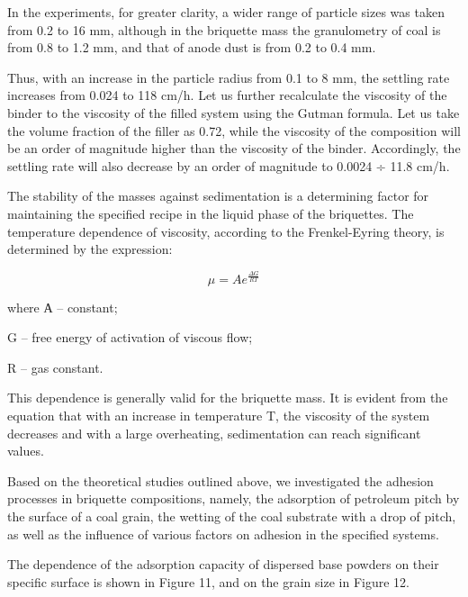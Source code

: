 \begin{multicols}{2}
In the experiments, for greater clarity, a wider range of particle sizes
was taken from 0.2 to 16 mm, although in the briquette mass the
granulometry of coal is from 0.8 to 1.2 mm, and that of anode dust is
from 0.2 to 0.4 mm.

Thus, with an increase in the particle radius from 0.1 to 8 mm, the
settling rate increases from 0.024 to 118 cm/h. Let us further
recalculate the viscosity of the binder to the viscosity of the filled
system using the Gutman formula. Let us take the volume fraction of the
filler as 0.72, while the viscosity of the composition will be an order
of magnitude higher than the viscosity of the binder. Accordingly, the
settling rate will also decrease by an order of magnitude to 0.0024 ÷
11.8 cm/h.

The stability of the masses against sedimentation is a determining
factor for maintaining the specified recipe in the liquid phase of the
briquettes. The temperature dependence of viscosity, according to the
Frenkel-Eyring theory, is determined by the expression:

\[\mu = Ae^{\frac{\Delta G}{RT}}\]

where А -- constant;

G -- free energy of activation of viscous flow;

R -- gas constant.

This dependence is generally valid for the briquette mass. It is evident
from the equation that with an increase in temperature T, the viscosity
of the system decreases and with a large overheating, sedimentation can
reach significant values.

Based on the theoretical studies outlined above, we investigated the
adhesion processes in briquette compositions, namely, the adsorption of
petroleum pitch by the surface of a coal grain, the wetting of the coal
substrate with a drop of pitch, as well as the influence of various
factors on adhesion in the specified systems.

The dependence of the adsorption capacity of dispersed base powders on
their specific surface is shown in Figure 11, and on the grain size in
Figure 12.
\end{multicols}

